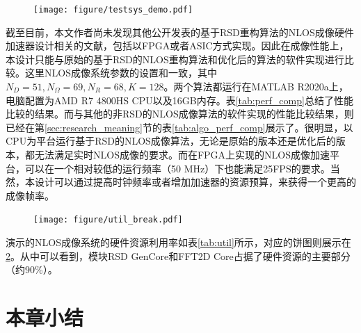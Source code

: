 \documentclass[master]{shtthesis}             %
\begin{document}
\begin{figure}[!tb]
  \centering
  \texttt{[image: figure/testsys\_demo.pdf]}
  \label{fig:testsys}
\end{figure}

截至目前，本文作者尚未发现其他公开发表的基于RSD重构算法的NLOS成像硬件加速器设计相关的文献，包括以FPGA或者ASIC方式实现。因此在成像性能上，本设计只能与原始的基于RSD的NLOS重构算法和优化后的算法的软件实现进行比较。这里NLOS成像系统参数的设置和\citet{Liu}一致，其中$N_D=51, N_\Omega=69, N_R=68, K=128$。两个算法都运行在MATLAB R2020a上，电脑配置为AMD R7 4800HS CPU以及16GB内存。表\ref{tab:perf_comp}总结了性能比较的结果。而与其他的非RSD的NLOS成像算法的软件实现的性能比较结果，则已经在第\ref{sec:research_meaning}节的表\ref{tab:algo_perf_comp}展示了。很明显，以CPU为平台运行基于RSD的NLOS成像算法，无论是原始的版本还是优化后的版本，都无法满足实时NLOS成像的要求。而在FPGA上实现的NLOS成像加速平台，可以在一个相对较低的运行频率（50 MHz）下也能满足25FPS的要求。当然，本设计可以通过提高时钟频率或者增加加速器的资源预算，来获得一个更高的成像帧率。
\begin{table}[!t]
    \centering
    \label{tab:util}
\end{table}
\begin{figure}[!tb]
    \centering
    \texttt{[image: figure/util\_break.pdf]}
    \label{fig:util_break}
\end{figure}

演示的NLOS成像系统的硬件资源利用率如表\ref{tab:util}所示，对应的饼图则展示在\ref{fig:util_break}。从中可以看到，模块RSD GenCore和FFT2D Core占据了硬件资源的主要部分（约90\%）。

\section{本章小结}
\end{document}
